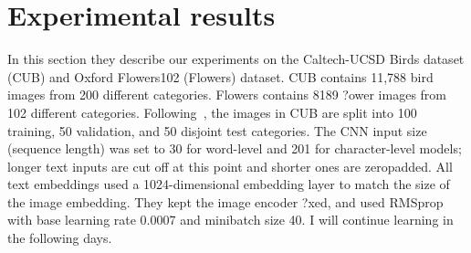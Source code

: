 \documentclass[10pt,twocolumn,letterpaper]{article}
\begin{document}
\section{ Experimental results}\label{Section 1}
In this section they describe our experiments on the Caltech-UCSD Birds dataset (CUB) and Oxford Flowers102 (Flowers) dataset. CUB contains 11,788 bird images from 200 different categories. Flowers contains 8189 ?ower images from 102 different categories. Following~\cite{name1}, the images in CUB are split into 100 training, 50 validation, and 50 disjoint test categories. The CNN input size (sequence length) was set to 30 for word-level and 201 for character-level models; longer text inputs are cut off at this point and shorter ones are zeropadded. All text embeddings used a 1024-dimensional embedding layer to match the size of the image embedding. They kept the image encoder ?xed, and used RMSprop with base learning rate 0.0007 and minibatch size 40. I will continue learning in the following days.
\newpage


\end{document}
